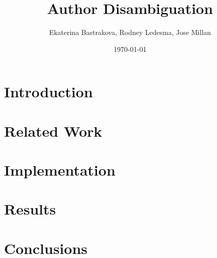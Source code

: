 \documentclass[a4paper,10pt]{article}
\begin{document}
    
    \title{Author Disambiguation}
    \author{Ekaterina Bastrakova, Rodney Ledesma, Jose Millan}
    \date{\today}
    \maketitle

    \begin{abstract}
         
    \end{abstract}
    
    
    \section{Introduction} \label{sec:1_intro}
     
    
    \section{Related Work} \label{sec:2_related_work}
     
    
    \section{Implementation} \label{sec:3_implementation}
     
        
    \section{Results} \label{sec:4_results}
     
   
    \section{Conclusions} \label{sec:5_conclusions}
     
 

    
    
\end{document}
